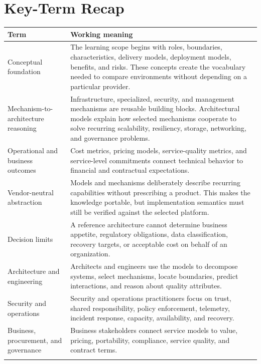 \documentclass[11pt]{article}
\begin{document}
\section{Key-Term Recap}
\begin{longtable}{@{}>{\RaggedRight\arraybackslash}p{}>{\RaggedRight\arraybackslash}p{}@{}}
\toprule\rowcolor{Navy}\color{white}\textbf{Term} & \color{white}\textbf{Working meaning}\\\midrule\endhead
Conceptual foundation & The learning scope begins with roles, boundaries, characteristics, delivery models, deployment models, benefits, and risks. These concepts create the vocabulary needed to compare environments without depending on a particular provider. \\\addlinespace[2pt]
Mechanism-to-architecture reasoning & Infrastructure, specialized, security, and management mechanisms are reusable building blocks. Architectural models explain how selected mechanisms cooperate to solve recurring scalability, resiliency, storage, networking, and governance problems. \\\addlinespace[2pt]
Operational and business outcomes & Cost metrics, pricing models, service-quality metrics, and service-level commitments connect technical behavior to financial and contractual expectations. \\\addlinespace[2pt]
Vendor-neutral abstraction & Models and mechanisms deliberately describe recurring capabilities without prescribing a product. This makes the knowledge portable, but implementation semantics must still be verified against the selected platform. \\\addlinespace[2pt]
Decision limits & A reference architecture cannot determine business appetite, regulatory obligations, data classification, recovery targets, or acceptable cost on behalf of an organization. \\\addlinespace[2pt]
Architecture and engineering & Architects and engineers use the models to decompose systems, select mechanisms, locate boundaries, predict interactions, and reason about quality attributes. \\\addlinespace[2pt]
Security and operations & Security and operations practitioners focus on trust, shared responsibility, policy enforcement, telemetry, incident response, capacity, availability, and recovery. \\\addlinespace[2pt]
Business, procurement, and governance & Business stakeholders connect service models to value, pricing, portability, compliance, service quality, and contract terms. \\\addlinespace[2pt]

\end{longtable}
\end{document}
